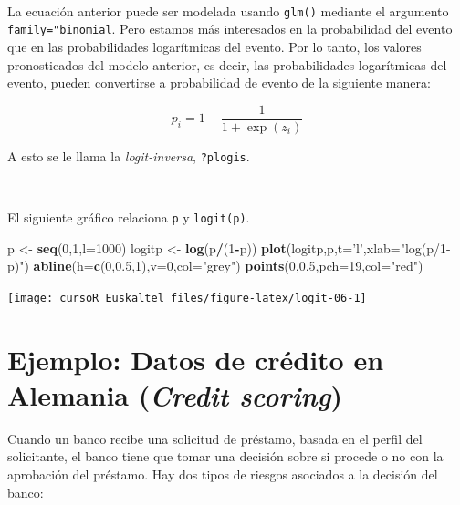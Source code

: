 \documentclass[]{book}
\newenvironment{Shaded}{\begin{snugshade}}{\end{snugshade}}
\newcommand{\KeywordTok}[1]{\textcolor[rgb]{0.13,0.29,0.53}{\textbf{#1}}}
\newcommand{\DataTypeTok}[1]{\textcolor[rgb]{0.13,0.29,0.53}{#1}}
\newcommand{\DecValTok}[1]{\textcolor[rgb]{0.00,0.00,0.81}{#1}}
\newcommand{\FloatTok}[1]{\textcolor[rgb]{0.00,0.00,0.81}{#1}}
\newcommand{\StringTok}[1]{\textcolor[rgb]{0.31,0.60,0.02}{#1}}
\newcommand{\OperatorTok}[1]{\textcolor[rgb]{0.81,0.36,0.00}{\textbf{#1}}}
\newcommand{\NormalTok}[1]{#1}
\begin{document}
~

La ecuación anterior puede ser modelada usando \texttt{glm()} mediante
el argumento \texttt{family="binomial}. Pero estamos más interesados en
la probabilidad del evento que en las probabilidades logarítmicas del
evento. Por lo tanto, los valores pronosticados del modelo anterior, es
decir, las probabilidades logarítmicas del evento, pueden convertirse a
probabilidad de evento de la siguiente manera:

\[
  p_i =1-\frac{1}{1 + \exp(z_i)}
\]

A esto se le llama la \emph{logit-inversa}, \texttt{?plogis}.

~

El siguiente gráfico relaciona \texttt{p} y \texttt{logit(p)}.

\begin{Shaded}
\begin{Highlighting}[]
\NormalTok{p <-}\StringTok{ }\KeywordTok{seq}\NormalTok{(}\DecValTok{0}\NormalTok{,}\DecValTok{1}\NormalTok{,}\DataTypeTok{l=}\DecValTok{1000}\NormalTok{)}
\NormalTok{logitp <-}\StringTok{ }\KeywordTok{log}\NormalTok{(p}\OperatorTok{/}\NormalTok{(}\DecValTok{1}\OperatorTok{-}\NormalTok{p))}
\KeywordTok{plot}\NormalTok{(logitp,p,}\DataTypeTok{t=}\StringTok{'l'}\NormalTok{,}\DataTypeTok{xlab=}\StringTok{"log(p/1-p)"}\NormalTok{)}
\KeywordTok{abline}\NormalTok{(}\DataTypeTok{h=}\KeywordTok{c}\NormalTok{(}\DecValTok{0}\NormalTok{,}\FloatTok{0.5}\NormalTok{,}\DecValTok{1}\NormalTok{),}\DataTypeTok{v=}\DecValTok{0}\NormalTok{,}\DataTypeTok{col=}\StringTok{"grey"}\NormalTok{)}
\KeywordTok{points}\NormalTok{(}\DecValTok{0}\NormalTok{,}\FloatTok{0.5}\NormalTok{,}\DataTypeTok{pch=}\DecValTok{19}\NormalTok{,}\DataTypeTok{col=}\StringTok{"red"}\NormalTok{)}
\end{Highlighting}
\end{Shaded}

\begin{center}\texttt{[image: cursoR\_Euskaltel\_files/figure-latex/logit-06-1]} \end{center}

\section{\texorpdfstring{Ejemplo: Datos de crédito en Alemania
(\emph{Credit
scoring})}{Ejemplo: Datos de crédito en Alemania (Credit scoring)}}\label{ejemplo-datos-de-credito-en-alemania-credit-scoring}

Cuando un banco recibe una solicitud de préstamo, basada en el perfil
del solicitante, el banco tiene que tomar una decisión sobre si procede
o no con la aprobación del préstamo. Hay dos tipos de riesgos asociados
a la decisión del banco:
\end{document}

